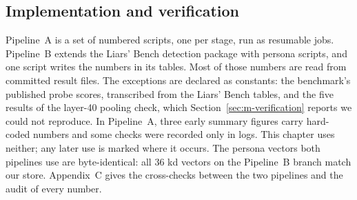 \subsection{Implementation and verification}
\label{sec:m-verify}

Pipeline~A is a set of numbered scripts, one per stage, run as resumable jobs. Pipeline~B extends the Liars' Bench detection package with persona scripts, and one script writes the numbers in its tables. %
Most of those numbers are read from committed result files. The exceptions are declared as constants: the benchmark's published probe scores, transcribed from the Liars' Bench tables, and the five results of the layer-40 pooling check, which Section~\ref{sec:m-verification} reports we could not reproduce. %
In Pipeline~A, three early summary figures carry hard-coded numbers and some checks were recorded only in logs. This chapter uses neither; any later use is marked where it occurs. %
The persona vectors both pipelines use are byte-identical: all 36 kd vectors on the Pipeline~B branch match our store. %
Appendix~C gives the cross-checks between the two pipelines and the audit of every number.
